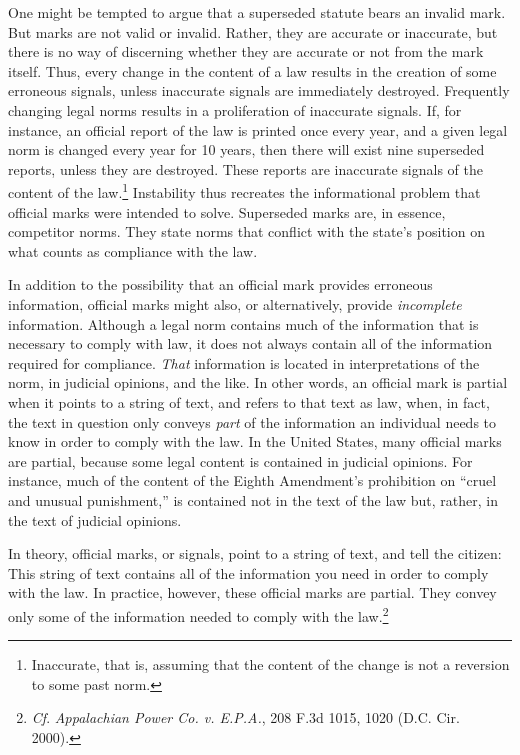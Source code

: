 One might be tempted to argue that a superseded statute bears an invalid
mark. But marks are not valid or invalid. Rather, they are accurate or
inaccurate, but there is no way of discerning whether they are accurate
or not from the mark itself. Thus, every change in the content of a law
results in the creation of some erroneous signals, unless inaccurate
signals are immediately destroyed. Frequently changing legal norms
results in a proliferation of inaccurate signals. If, for instance, an
official report of the law is printed once every year, and a given legal
norm is changed every year for 10 years, then there will exist nine
superseded reports, unless they are destroyed. These reports are
inaccurate signals of the content of the law.\footnote{Inaccurate, that
  is, assuming that the content of the change is not a reversion to some
  past norm.} Instability thus recreates the informational problem that
official marks were intended to solve. Superseded marks are, in essence,
competitor norms. They state norms that conflict with the state's
position on what counts as compliance with the law.

In addition to the possibility that an official mark provides erroneous
information, official marks might also, or alternatively, provide
\emph{incomplete} information. Although a legal norm contains much of
the information that is necessary to comply with law, it does not always
contain all of the information required for compliance. \emph{That}
information is located in interpretations of the norm, in judicial
opinions, and the like. In other words, an official mark is partial when
it points to a string of text, and refers to that text as law, when, in
fact, the text in question only conveys \emph{part} of the information
an individual needs to know in order to comply with the law. In the
United States, many official marks are partial, because some legal
content is contained in judicial opinions. For instance, much of the
content of the Eighth Amendment's prohibition on ``cruel and unusual
punishment,'' is contained not in the text of the law but, rather, in
the text of judicial opinions.

In theory, official marks, or signals, point to a string of text, and
tell the citizen: This string of text contains all of the information
you need in order to comply with the law. In practice, however, these
official marks are partial. They convey only some of the information
needed to comply with the law.\footnote{\emph{Cf}. \emph{Appalachian
  Power Co. v. E.P.A.}, 208 F.3d 1015, 1020 (D.C. Cir. 2000).}

